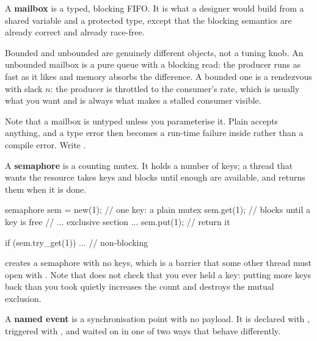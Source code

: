 A \textbf{mailbox} is a typed, blocking FIFO. It is what a \VHDL{} designer
would build from a shared variable and a protected type, except that the
blocking semantics are already correct and already race-free.


Bounded and unbounded are genuinely different objects, not a tuning knob. An
unbounded mailbox is a pure queue with a blocking read: the producer runs as
fast as it likes and memory absorbs the difference. A bounded one is a
rendezvous with slack $n$: the producer is throttled to the consumer's rate,
which is usually what you want and is always what makes a stalled consumer
visible.

Note that a mailbox is untyped unless you parameterise it. Plain
 accepts anything, and a type error then becomes a
run-time failure inside  rather than a compile error. Write
.

A \textbf{semaphore} is a counting mutex. It holds a number of keys; a thread
that wants the resource takes keys and blocks until enough are available, and
returns them when it is done.

\begin{svcode}
semaphore sem = new(1);    // one key: a plain mutex
sem.get(1);                // blocks until a key is free
// ... exclusive section ...
sem.put(1);                // return it

if (sem.try_get(1)) ...    // non-blocking
\end{svcode}

 creates a semaphore with no keys, which is a barrier that some
other thread must open with . Note that  does not check
that you ever held a key: putting more keys back than you took quietly
increases the count and destroys the mutual exclusion.

A \textbf{named event} is a synchronisation point with no payload. It is
declared with , triggered with \code{->}, and waited on in one of
two ways that behave differently.

